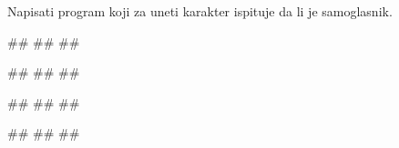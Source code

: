 \begin{Exercise}[label=v1.2_11] 
Napisati program koji za uneti karakter ispituje da li je samoglasnik.

\begin{miditest}
\begin{upotreba}{1}
#\naslovInt#
##
##
\end{upotreba}
\end{miditest}
\begin{miditest}
\begin{upotreba}{2}
#\naslovInt#
##
##
\end{upotreba}
\end{miditest}

\begin{miditest}
\begin{upotreba}{3}
#\naslovInt#
##
##
\end{upotreba}
\end{miditest}
\begin{miditest}
\begin{upotreba}{4}
#\naslovInt#
##
##
\end{upotreba}
\end{miditest}

\end{Exercise}
\ifresenja
 \begin{Answer}[ref=v1.2_11]
\end{Answer}
\fi

